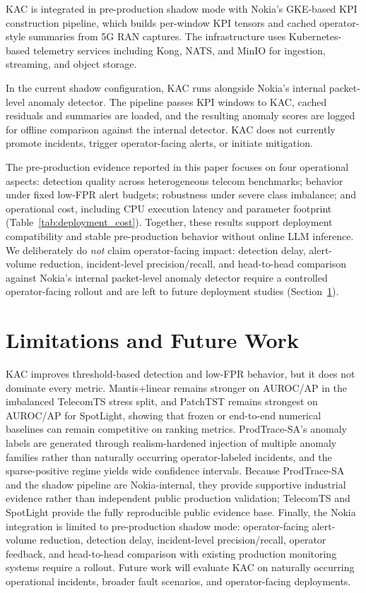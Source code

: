 \documentclass[conference]{IEEEtran}
\begin{document}
KAC is integrated in pre-production shadow mode with Nokia's GKE-based KPI construction pipeline, which builds per-window KPI tensors and cached operator-style summaries from 5G RAN captures. The infrastructure uses Kubernetes-based telemetry services including Kong, NATS, and MinIO for ingestion, streaming, and object storage.

In the current shadow configuration, KAC runs alongside Nokia's internal packet-level anomaly detector. The pipeline passes KPI windows to KAC, cached residuals and summaries are loaded, and the resulting anomaly scores are logged for offline comparison against the internal detector. KAC does not currently promote incidents, trigger operator-facing alerts, or initiate mitigation.

The pre-production evidence reported in this paper focuses on four operational aspects: detection quality across heterogeneous telecom benchmarks; behavior under fixed low-FPR alert budgets; robustness under severe class imbalance; and operational cost, including CPU execution latency and parameter footprint (Table~\ref{tab:deployment_cost}). Together, these results support deployment compatibility and stable pre-production behavior without online LLM inference. We deliberately do \emph{not} claim operator-facing impact: detection delay, alert-volume reduction, incident-level precision/recall, and head-to-head comparison against Nokia's internal packet-level anomaly detector require a controlled operator-facing rollout and are left to future deployment studies (Section~\ref{sec:limitations}).

\section{Limitations and Future Work}
\label{sec:limitations}

KAC improves threshold-based detection and low-FPR behavior, but it does not dominate every metric. Mantis+linear remains stronger on AUROC/AP in the imbalanced TelecomTS stress split, and PatchTST remains strongest on AUROC/AP for SpotLight, showing that frozen or end-to-end numerical baselines can remain competitive on ranking metrics. ProdTrace-SA's anomaly labels are generated through realism-hardened injection of multiple anomaly families rather than naturally occurring operator-labeled incidents, and the sparse-positive regime yields wide confidence intervals. Because ProdTrace-SA and the shadow pipeline are Nokia-internal, they provide supportive industrial evidence rather than independent public production validation; TelecomTS and SpotLight provide the fully reproducible public evidence base. Finally, the Nokia integration is limited to pre-production shadow mode: operator-facing alert-volume reduction, detection delay, incident-level precision/recall, operator feedback, and head-to-head comparison with existing production monitoring systems require a rollout. Future work will evaluate KAC on naturally occurring operational incidents, broader fault scenarios, and operator-facing deployments.
\end{document}
